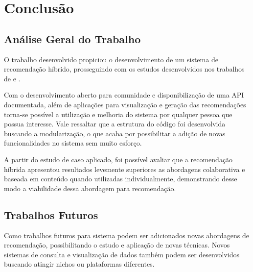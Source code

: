 \chapter{\textbf{Conclusão}} %

\section{Análise Geral do Trabalho}

O trabalho desenvolvido propiciou o desenvolvimento de um sistema de recomendação híbrido, prosseguindo com os estudos desenvolvidos nos trabalhos de  e .

Com o desenvolvimento aberto para comunidade e disponibilização de uma API documentada, além de aplicações para visualização e geração das recomendações torna-se possível a utilização e melhoria do sistema por qualquer pessoa que possua interesse. Vale ressaltar que a estrutura do código foi desenvolvida buscando a modularização, o que acaba por possibilitar a adição de novas funcionalidades no sistema sem muito esforço.

A partir do estudo de caso aplicado, foi possível avaliar que a recomendação híbrida apresentou resultados levemente superiores as abordagens colaborativa e baseada em conteúdo quando utilizadas individualmente, demonstrando desse modo a viabilidade dessa abordagem para recomendação.

\section{Trabalhos Futuros}

Como trabalhos futuros para sistema podem ser adicionados novas abordagens de recomendação, possibilitando o estudo e aplicação de novas técnicas. Novos sistemas de consulta e visualização de dados também podem ser desenvolvidos buscando atingir nichos ou plataformas diferentes.